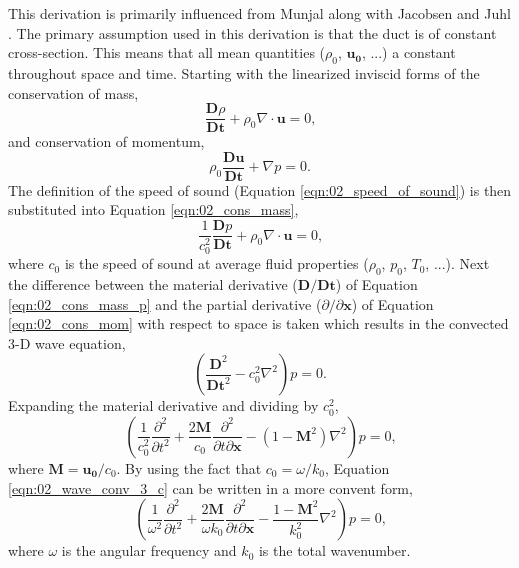 This derivation is primarily influenced from Munjal \cite{Munjal-2014-w28y4EyP} along with Jacobsen and Juhl \cite{Jacobsen-2013-PHD3v3YZ}.
The primary assumption used in this derivation is that the duct is of constant cross-section.
This means that all mean quantities ($\rho_0$, $\mathbf{u_0}$, ...) a constant throughout space and time.
Starting with the linearized inviscid forms of the conservation of mass,
\begin{equation}
  \frac{\mathbf{D}\rho}{\mathbf{Dt}} + \rho_0\nabla\cdot\mathbf{u} = 0 \textrm{,}
  \label{eqn:02_cons_mass}
\end{equation}
and conservation of momentum,
\begin{equation}
  \rho_0\frac{\mathbf{Du}}{\mathbf{Dt}} + \nabla p = 0 \textrm{.}
  \label{eqn:02_cons_mom}
\end{equation}
The definition of the speed of sound (Equation \ref{eqn:02_speed_of_sound}) is then substituted into Equation \ref{eqn:02_cons_mass},
\begin{equation}
  \frac{1}{c_0^2}\frac{\mathbf{D}p}{\mathbf{Dt}} + \rho_0\nabla\cdot\mathbf{u} = 0 \textrm{,}
  \label{eqn:02_cons_mass_p}
\end{equation}
where $c_0$ is the speed of sound at average fluid properties ($\rho_0$, $p_0$, $T_0$, ...).
Next the difference between the material derivative ($\mathbf{D}/\mathbf{Dt}$) of Equation \ref{eqn:02_cons_mass_p} and the partial derivative ($\partial/\partial\mathbf{x}$) of Equation \ref{eqn:02_cons_mom} with respect to space is taken which results in the convected 3-D wave equation,
\begin{equation}
  \left(\frac{\mathbf{D}^2}{\mathbf{Dt}^2}-c_0^2\nabla^2\right)p=0\textrm{.}
  \label{eqn:02_wave_conv_3_c}
\end{equation}
Expanding the material derivative and dividing by $c_0^2$,
\begin{equation}
  \left(\frac{1}{c_0^2}\frac{\partial^2}{\partial t^2} + \frac{2\mathbf{M}}{c_0}\frac{\partial^2}{\partial t\partial\mathbf{x}} - (1-\mathbf{M}^2)\nabla^2\right)p = 0 \textrm{,}
  \label{eqn:02_wave_conv_expand}
\end{equation}
where $\mathbf{M} = \mathbf{u_0}/c_0$.
By using the fact that $c_0=\omega/k_0$, Equation \ref{eqn:02_wave_conv_3_c} can be written in a more convent form,
\begin{equation}
  \left(\frac{1}{\omega^2}\frac{\partial^2}{\partial t^2} + \frac{2\mathbf{M}}{\omega k_0}\frac{\partial^2}{\partial t\partial\mathbf{x}} - \frac{1-\mathbf{M}^2}{k_0^2}\nabla^2\right)p = 0 \textrm{,}
  \label{eqn:02_wave_conv_3}
\end{equation}
where $\omega$ is the angular frequency and $k_0$ is the total wavenumber.

